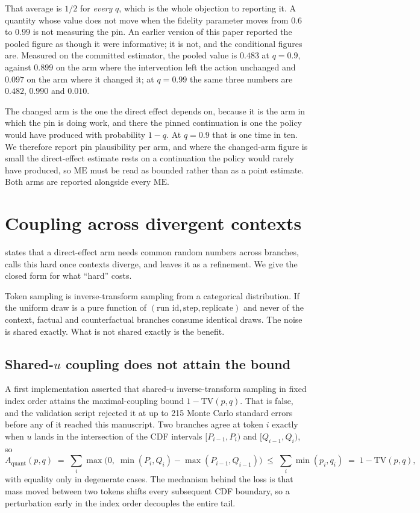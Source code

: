\documentclass[11pt]{article}
\theoremstyle{remark}
\newcommand{\ME}{\mathrm{ME}}
\newcommand{\TV}{\mathrm{TV}}
\begin{document}
That average is $1/2$ for \emph{every} $q$, which is the whole objection to
reporting it. A quantity whose value does not move when the fidelity parameter
moves from $0.6$ to $0.99$ is not measuring the pin. An earlier version of this
paper reported the pooled figure as though it were informative; it is not, and
the conditional figures are. Measured on the committed estimator, the pooled
value is $0.483$ at $q = 0.9$, against $0.899$ on the arm where the intervention
left the action unchanged and $0.097$ on the arm where it changed it; at
$q = 0.99$ the same three numbers are $0.482$, $0.990$ and $0.010$.

The changed arm is the one the direct effect depends on, because it is the arm
in which the pin is doing work, and there the pinned continuation is one the
policy would have produced with probability $1-q$. At $q = 0.9$ that is one time
in ten. We therefore report pin plausibility per arm, and where the changed-arm
figure is small the direct-effect estimate rests on a continuation the policy
would rarely have produced, so $\ME$ must be read as bounded rather than as a
point estimate. Both arms are reported alongside every $\ME$.

\section{Coupling across divergent contexts}
\label{sec:coupling}

\citet[\S7]{car2026} states that a direct-effect arm needs common random numbers
across branches, calls this hard once contexts diverge, and leaves it as a
refinement. We give the closed form for what ``hard'' costs.

Token sampling is inverse-transform sampling from a categorical distribution. If
the uniform draw is a pure function of $(\text{run id}, \text{step},
\text{replicate})$ and never of the context, factual and counterfactual branches
consume identical draws. The noise is shared exactly. What is not shared exactly
is the benefit.

\subsection{Shared-\texorpdfstring{$u$}{u} coupling does not attain the bound}

A first implementation asserted that shared-$u$ inverse-transform sampling in
fixed index order attains the maximal-coupling bound $1 - \TV(p,q)$. That is
false, and the validation script rejected it at up to 215 Monte Carlo standard
errors before any of it reached this manuscript. Two branches agree at token $i$
exactly when $u$ lands in the intersection of the CDF intervals
$[P_{i-1},P_i)$ and $[Q_{i-1},Q_i)$, so
\begin{equation}
  A_{\mathrm{quant}}(p,q) \;=\;
    \sum_i \max\!\bigl(0,\; \min(P_i,Q_i) - \max(P_{i-1},Q_{i-1})\bigr)
  \;\le\; \sum_i \min(p_i,q_i) \;=\; 1 - \TV(p,q),
  \label{eq:quant}
\end{equation}
with equality only in degenerate cases. The mechanism behind the loss is that
mass moved between two tokens shifts every subsequent CDF boundary, so a
perturbation early in the index order decouples the entire tail.
\end{document}
